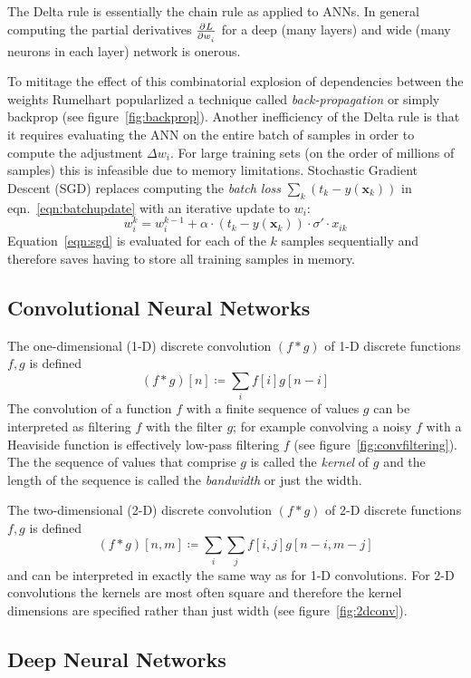 The Delta rule is essentially the chain rule as applied to ANNs. 
%
In general computing the partial derivatives \(\pd{L}{w_i}\) for a deep (many layers) and wide (many neurons in each layer) network is onerous.
%

To mititage the effect of this combinatorial explosion of dependencies between the weights Rumelhart \etal\cite{rumelhart1988learning} popularlized a technique called \textit{back-propagation} or simply backprop (see figure~\ref{fig:backprop}).
%
Another inefficiency of the Delta rule is that it requires evaluating the ANN on the entire batch of samples in order to compute the adjustment \(\Delta w_i\).
%
For large training sets (on the order of millions of samples) this is infeasible due to memory limitations.
%
Stochastic Gradient Descent (SGD) replaces computing the \textit{batch loss} \(\sum_k(t_k-y(\mathbf{x}_k))\) in eqn.~\eqref{eqn:batchupdate} with an iterative update to \(w_i\):
\begin{equation}
    w_i^k = w_i^{k-1} + \alpha \cdot (t_k-y(\mathbf{x}_k))\cdot \sigma'\cdot x_{ik}
    \label{eqn:sgd}
\end{equation}
Equation~\eqref{eqn:sgd} is evaluated for each of the \(k\) samples sequentially and therefore saves having to store all training samples in memory.
\subsection{Convolutional Neural Networks}


The one-dimensional (1-D) discrete convolution \((f*g)\) of 1-D discrete functions \(f,g\) is defined 
\begin{equation}
    (f*g)[n]\coloneqq \sum _{i} f[i]g[n-i]
\end{equation}
The convolution of a function \(f\) with a finite sequence of values \(g\) can be interpreted as filtering \(f\) with the filter \(g\); for example convolving a noisy \(f\) with a Heaviside function is effectively low-pass filtering \(f\) (see figure~\ref{fig:convfiltering}).
%
The the sequence of values that comprise \(g\) is called the \textit{kernel} of \(g\) and the length of the sequence is called the \textit{bandwidth} or just the width.

The two-dimensional (2-D) discrete convolution \((f*g)\) of 2-D discrete functions \(f,g\) is defined 
\begin{equation}
    (f*g)[n, m]\coloneqq \sum _{i}\sum _{j}f[i, j]g[n-i, m-j]
\end{equation}
and can be interpreted in exactly the same way as for 1-D convolutions.
%
For 2-D convolutions the kernels are most often square and therefore the kernel dimensions are specified rather than just width (see figure~\ref{fig:2dconv}).
\subsection{Deep Neural Networks}
